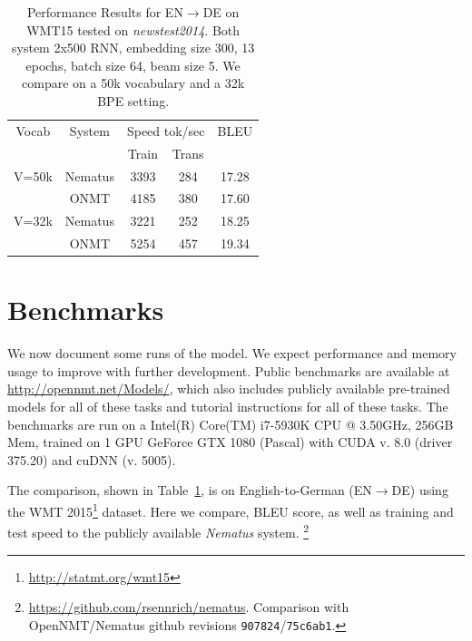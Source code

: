 \documentclass[11pt,a4paper]{article}
\begin{document}
\begin{table}
  \centering
  \begin{tabular}{ccccc}
    \toprule
    Vocab & System & \multicolumn{2}{c}{Speed tok/sec}  & BLEU\\
     &  & Train  & Trans  &  \\
    \midrule
 V=50k & Nematus  & 3393 & 284 & 17.28 \\
     & ONMT  &4185 & 380 & 17.60 \\ 
    \midrule 
  V=32k & Nematus & 3221& 252 & 18.25 \\
    & ONMT &5254 & 457 & 19.34\\ 
    \bottomrule
  \end{tabular}

  \caption{ \small \label{tab:res} Performance Results for EN$\rightarrow$DE on WMT15 tested on \textit{newstest2014}. Both system 2x500 RNN, embedding size 300, 13 epochs, batch size 64, beam size 5. We compare on a 50k vocabulary and a 32k BPE setting.}
\end{table}

\section{Benchmarks}









We now document some runs of the model. We expect performance and
memory usage to improve with further development.  Public benchmarks
are available at \url{http://opennmt.net/Models/}, which also includes
publicly available pre-trained models for all of these tasks and
tutorial instructions for all of these tasks. The benchmarks are
run on a Intel(R) Core(TM) i7-5930K CPU @ 3.50GHz, 256GB Mem,
trained on 1 GPU GeForce GTX 1080 (Pascal) with CUDA v. 8.0 (driver
375.20) and cuDNN (v. 5005).

The comparison, shown in Table~\ref{tab:res}, is on English-to-German
(EN$\rightarrow$DE) using the WMT
2015\footnote{\url{http://statmt.org/wmt15}} dataset. Here we compare,
BLEU score, as well as training and test speed to the publicly
available \textit{Nematus} system. 
\footnote{\url{https://github.com/rsennrich/nematus}. Comparison with
  OpenNMT/Nematus github revisions {\tt 907824}/{\tt 75c6ab1}.}

\end{document}
